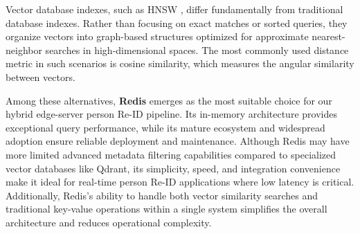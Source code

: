 \documentclass[../main.tex]{subfiles}
\begin{document}
Vector database indexes, such as HNSW \cite{hnsw}, differ fundamentally from traditional database indexes. Rather than focusing on exact matches or sorted queries, they organize vectors into graph-based structures optimized for approximate nearest-neighbor searches in high-dimensional spaces. The most commonly used distance metric in such scenarios is cosine similarity, which measures the angular similarity between vectors.

Among these alternatives, \textbf{Redis} emerges as the most suitable choice for our hybrid edge-server person Re-ID pipeline. Its in-memory architecture provides exceptional query performance, while its mature ecosystem and widespread adoption ensure reliable deployment and maintenance. Although Redis may have more limited advanced metadata filtering capabilities compared to specialized vector databases like Qdrant, its simplicity, speed, and integration convenience make it ideal for real-time person Re-ID applications where low latency is critical. Additionally, Redis's ability to handle both vector similarity searches and traditional key-value operations within a single system simplifies the overall architecture and reduces operational complexity.
\end{document}
